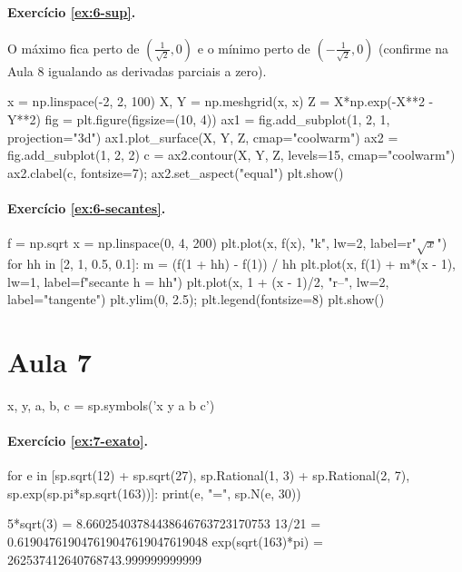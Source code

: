\paragraph{Exercício \ref{ex:6-sup}.} O máximo fica perto de $\left(\frac{1}{\sqrt2},0\right)$ e o mínimo perto de
$\left(-\frac{1}{\sqrt2},0\right)$ (confirme na Aula 8 igualando as derivadas parciais a zero).
\begin{entrada}
x = np.linspace(-2, 2, 100)
X, Y = np.meshgrid(x, x)
Z = X*np.exp(-X**2 - Y**2)
fig = plt.figure(figsize=(10, 4))
ax1 = fig.add_subplot(1, 2, 1, projection="3d")
ax1.plot_surface(X, Y, Z, cmap="coolwarm")
ax2 = fig.add_subplot(1, 2, 2)
c = ax2.contour(X, Y, Z, levels=15, cmap="coolwarm")
ax2.clabel(c, fontsize=7); ax2.set_aspect("equal")
plt.show()
\end{entrada}

\paragraph{Exercício \ref{ex:6-secantes}.}
\begin{entrada}
f = np.sqrt
x = np.linspace(0, 4, 200)
plt.plot(x, f(x), "k", lw=2, label=r"$\sqrt{x}$")
for hh in [2, 1, 0.5, 0.1]:
    m = (f(1 + hh) - f(1)) / hh
    plt.plot(x, f(1) + m*(x - 1), lw=1, label=f"secante h = {hh}")
plt.plot(x, 1 + (x - 1)/2, "r--", lw=2, label="tangente")
plt.ylim(0, 2.5); plt.legend(fontsize=8)
plt.show()
\end{entrada}

\section*{Aula 7}

\begin{entrada}
x, y, a, b, c = sp.symbols('x y a b c')
\end{entrada}

\paragraph{Exercício \ref{ex:7-exato}.}
\begin{entrada}
for e in [sp.sqrt(12) + sp.sqrt(27), sp.Rational(1, 3) + sp.Rational(2, 7), sp.exp(sp.pi*sp.sqrt(163))]:
    print(e, "=", sp.N(e, 30))
\end{entrada}
\begin{saida}
5*sqrt(3) = 8.66025403784438646763723170753
13/21 = 0.619047619047619047619047619048
exp(sqrt(163)*pi) = 262537412640768743.999999999999
\end{saida}


